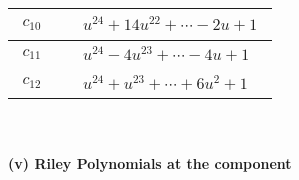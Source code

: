 \documentclass[1p]{elsarticle_modified}
\theoremstyle{definition}
\begin{document}
\begin{tabular}{m{50pt}|m{274pt}}
\hline $$\begin{aligned}c_{10}\end{aligned}$$&$\begin{aligned}
&u^{24}+14 u^{22}+\cdots-2 u+1
\end{aligned}$\\
\hline $$\begin{aligned}c_{11}\end{aligned}$$&$\begin{aligned}
&u^{24}-4 u^{23}+\cdots-4 u+1
\end{aligned}$\\
\hline $$\begin{aligned}c_{12}\end{aligned}$$&$\begin{aligned}
&u^{24}+u^{23}+\cdots+6 u^2+1
\end{aligned}$\\
\hline
\end{tabular}\\~\\
\newpage\renewcommand{\arraystretch}{1}
\flushleft \textbf{(v) Riley Polynomials at the component}\newline \\
\end{document}

